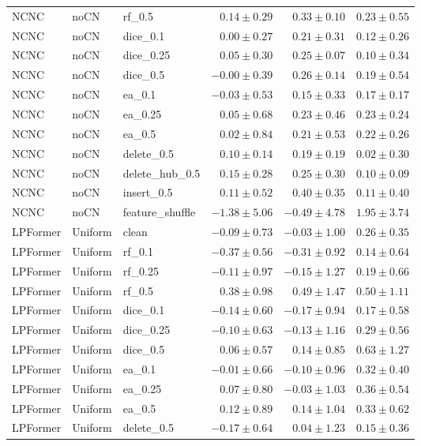 \documentclass[UTF8,a4paper,11pt,fontset=fandol]{ctexart}
\begin{document}
{\begin{longtable}{lllrrr}
NCNC & noCN & rf\_0.5 & $0.14\pm0.29$ & $0.33\pm0.10$ & $0.23\pm0.55$ \\
NCNC & noCN & dice\_0.1 & $0.00\pm0.27$ & $0.21\pm0.31$ & $0.12\pm0.26$ \\
NCNC & noCN & dice\_0.25 & $0.05\pm0.30$ & $0.25\pm0.07$ & $0.10\pm0.34$ \\
NCNC & noCN & dice\_0.5 & $-0.00\pm0.39$ & $0.26\pm0.14$ & $0.19\pm0.54$ \\
NCNC & noCN & ea\_0.1 & $-0.03\pm0.53$ & $0.15\pm0.33$ & $0.17\pm0.17$ \\
NCNC & noCN & ea\_0.25 & $0.05\pm0.68$ & $0.23\pm0.46$ & $0.23\pm0.24$ \\
NCNC & noCN & ea\_0.5 & $0.02\pm0.84$ & $0.21\pm0.53$ & $0.22\pm0.26$ \\
NCNC & noCN & delete\_0.5 & $0.10\pm0.14$ & $0.19\pm0.19$ & $0.02\pm0.30$ \\
NCNC & noCN & delete\_hub\_0.5 & $0.15\pm0.28$ & $0.25\pm0.30$ & $0.10\pm0.09$ \\
NCNC & noCN & insert\_0.5 & $0.11\pm0.52$ & $0.40\pm0.35$ & $0.11\pm0.40$ \\
NCNC & noCN & feature\_shuffle & $-1.38\pm5.06$ & $-0.49\pm4.78$ & $1.95\pm3.74$ \\
LPFormer & Uniform & clean & $-0.09\pm0.73$ & $-0.03\pm1.00$ & $0.26\pm0.35$ \\
LPFormer & Uniform & rf\_0.1 & $-0.37\pm0.56$ & $-0.31\pm0.92$ & $0.14\pm0.64$ \\
LPFormer & Uniform & rf\_0.25 & $-0.11\pm0.97$ & $-0.15\pm1.27$ & $0.19\pm0.66$ \\
LPFormer & Uniform & rf\_0.5 & $0.38\pm0.98$ & $0.49\pm1.47$ & $0.50\pm1.11$ \\
LPFormer & Uniform & dice\_0.1 & $-0.14\pm0.60$ & $-0.17\pm0.94$ & $0.17\pm0.58$ \\
LPFormer & Uniform & dice\_0.25 & $-0.10\pm0.63$ & $-0.13\pm1.16$ & $0.29\pm0.56$ \\
LPFormer & Uniform & dice\_0.5 & $0.06\pm0.57$ & $0.14\pm0.85$ & $0.63\pm1.27$ \\
LPFormer & Uniform & ea\_0.1 & $-0.01\pm0.66$ & $-0.10\pm0.96$ & $0.32\pm0.40$ \\
LPFormer & Uniform & ea\_0.25 & $0.07\pm0.80$ & $-0.03\pm1.03$ & $0.36\pm0.54$ \\
LPFormer & Uniform & ea\_0.5 & $0.12\pm0.89$ & $0.14\pm1.04$ & $0.33\pm0.62$ \\
LPFormer & Uniform & delete\_0.5 & $-0.17\pm0.64$ & $0.04\pm1.23$ & $0.15\pm0.36$ \\

\end{longtable}}
\end{document}
